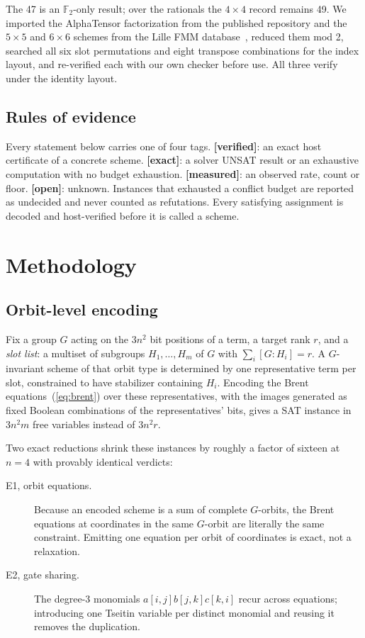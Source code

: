 \documentclass[11pt]{article}
\newcommand{\FF}{\mathbb{F}_2}
\begin{document}
The 47 is an $\FF$-only result; over the rationals the $4\times4$ record remains 49. We imported the
AlphaTensor factorization from the published repository and the $5\times5$ and $6\times6$ schemes from
the Lille FMM database~\cite{fmmdb}, reduced them mod 2, searched all six slot permutations and eight
transpose combinations for the index layout, and re-verified each with our own checker before use. All
three verify under the identity layout.

\subsection{Rules of evidence}
\label{sec:evidence}

Every statement below carries one of four tags. \textbf{[verified]}: an exact host certificate of a
concrete scheme. \textbf{[exact]}: a solver UNSAT result or an exhaustive computation with no budget
exhaustion. \textbf{[measured]}: an observed rate, count or floor. \textbf{[open]}: unknown. Instances
that exhausted a conflict budget are reported as undecided and never counted as refutations. Every
satisfying assignment is decoded and host-verified before it is called a scheme.

\section{Methodology}
\label{sec:method}

\subsection{Orbit-level encoding}

Fix a group $G$ acting on the $3n^2$ bit positions of a term, a target rank $r$, and a
\emph{slot list}: a multiset of subgroups $H_1,\dots,H_m$ of $G$ with $\sum_i [G:H_i] = r$. A
$G$-invariant scheme of that orbit type is determined by one representative term per slot, constrained to
have stabilizer containing $H_i$. Encoding the Brent equations~(\ref{eq:brent}) over these
representatives, with the images generated as fixed Boolean combinations of the representatives' bits,
gives a SAT instance in $3n^2 m$ free variables instead of $3n^2 r$.

Two exact reductions shrink these instances by roughly a factor of sixteen at $n=4$ with provably
identical verdicts:

\begin{description}
\item[E1, orbit equations.] Because an encoded scheme is a sum of complete $G$-orbits, the Brent
equations at coordinates in the same $G$-orbit are literally the same constraint. Emitting one equation
per orbit of coordinates is exact, not a relaxation.
\item[E2, gate sharing.] The degree-3 monomials $a[i,j]b[j,k]c[k,i]$ recur across equations; introducing
one Tseitin variable per distinct monomial and reusing it removes the duplication.
\end{description}
\end{document}
